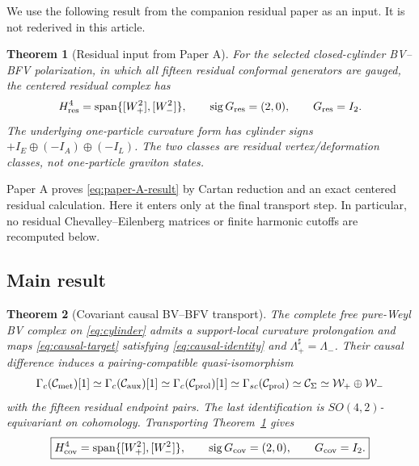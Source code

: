 \documentclass[11pt]{article}
\newtheorem{theorem}{Theorem}[section]
\theoremstyle{definition}
\theoremstyle{remark}
\newcommand{\W}{\mathcal W}
\newcommand{\cC}{\mathcal C}
\begin{document}
We use the following result from the companion residual paper as an input.
It is not rederived in this article.

\begin{theorem}[Residual input from Paper A]\label{thm:paper-A-input}
For the selected closed-cylinder BV--BFV polarization, in which all fifteen
residual conformal generators are gauged, the centered residual complex has
\begin{equation}\label{eq:paper-A-result}
 H^4_{\rm res}
 =\operatorname{span}\{[W_+^2],[W_-^2]\},
 \qquad \operatorname{sig}G_{\rm res}=(2,0),
 \qquad G_{\rm res}=I_2.
\end{equation}
The underlying one-particle curvature form has cylinder signs
$+I_E\oplus(-I_A)\oplus(-I_L)$.  The two classes are residual
vertex/deformation classes, not one-particle graviton states.
\end{theorem}

Paper A proves \eqref{eq:paper-A-result} by Cartan reduction and an exact
centered residual calculation.  Here it enters only at the final transport
step.  In particular, no residual Chevalley--Eilenberg matrices or finite
harmonic cutoffs are recomputed below.

\subsection{Main result}

\begin{theorem}[Covariant causal BV--BFV transport]\label{thm:main}
The complete free pure-Weyl BV complex on \eqref{eq:cylinder} admits a
support-local curvature prolongation and maps \eqref{eq:causal-target}
satisfying \eqref{eq:causal-identity} and
$\Lambda_+^\sharp=\Lambda_-$.  Their causal difference induces a
pairing-compatible quasi-isomorphism
\begin{equation}\label{eq:main-chain}
 \Gamma_c(\cC_{\rm met})[1]
 \simeq \Gamma_c(\cC_{\rm aux})[1]
 \simeq \Gamma_c(\cC_{\rm prol})[1]
 \simeq \Gamma_{sc}(\cC_{\rm prol})
 \simeq \cC_\Sigma
 \simeq \W_+\oplus\W_-
\end{equation}
with the fifteen residual endpoint pairs.  The last identification is
$SO(4,2)$-equivariant on cohomology.  Transporting
Theorem~\ref{thm:paper-A-input} gives
\begin{equation}\label{eq:main-H4}
 \boxed{
 H^4_{\rm cov}=\operatorname{span}\{[W_+^2],[W_-^2]\},
 \qquad \operatorname{sig}G_{\rm cov}=(2,0),
 \qquad G_{\rm cov}=I_2.}
\end{equation}
\end{theorem}
\end{document}
